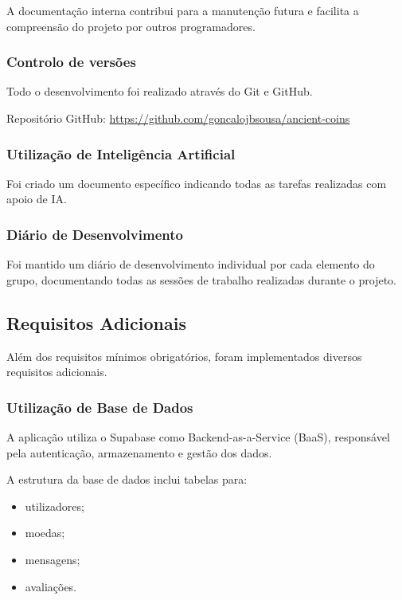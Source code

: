 \documentclass[12pt,a4paper]{article}
\begin{document}
A documentação interna contribui para a manutenção futura e facilita a compreensão do projeto por outros programadores.

\subsubsection{Controlo de versões}

Todo o desenvolvimento foi realizado através do Git e GitHub.

Repositório GitHub: \url{https://github.com/goncalojbsousa/ancient-coins}

\subsubsection{Utilização de Inteligência Artificial}

Foi criado um documento específico indicando todas as tarefas realizadas com apoio de IA.

\subsubsection{Diário de Desenvolvimento}

Foi mantido um diário de desenvolvimento individual por cada elemento do grupo, documentando todas as sessões de trabalho realizadas durante o projeto.

\subsection{Requisitos Adicionais}

Além dos requisitos mínimos obrigatórios, foram implementados diversos requisitos adicionais.

\subsubsection{Utilização de Base de Dados}

A aplicação utiliza o Supabase como Backend-as-a-Service (BaaS), responsável pela autenticação, armazenamento e gestão dos dados.

A estrutura da base de dados inclui tabelas para:

\begin{itemize}
\setlength{\itemsep}{0.15em}
\item utilizadores;
\item moedas;
\item mensagens;
\item avaliações.
\end{itemize}
\end{document}
